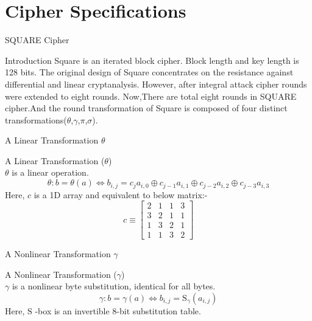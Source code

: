 \section{Cipher Specifications}

\begin{frame}{SQUARE Cipher}
  \begin{beamerboxesrounded}{Introduction}
      Square is an iterated block cipher. Block length and key length is 128 bits.
      The original design of Square concentrates on the resistance against differential and linear cryptanalysis. However, after integral attack cipher rounds were extended to eight rounds. Now,There are total eight rounds in SQUARE cipher.And the round transformation of Square is composed of four distinct transformations($\theta$,$\gamma$,$\pi$,$\sigma$).
  \end{beamerboxesrounded}
\end{frame}


\begin{frame}{A Linear Transformation $\theta$}
    \begin{beamerboxesrounded}{A Linear Transformation ($\theta$)} \\
        $\theta$ is a linear operation.
        $$
        \theta: b=\theta(a) \Leftrightarrow b_{i, j}=c_{j} a_{i, 0} \oplus c_{j-1} a_{i, 1} \oplus c_{j-2} a_{i, 2} \oplus c_{j-3} a_{i, 3}
        $$
        Here, $c$ is a 1D array and equivalent to below matrix:-  \\
        \begin{equation*}
          c   \equiv \begin{bmatrix}
            2 & 1 & 1 & 3 \\
            3 & 2 & 1 & 1 \\
            1 & 3 & 2 & 1 \\
            1 & 1 & 3 & 2
          \end{bmatrix}
        \end{equation*}
    \end{beamerboxesrounded}
\end{frame}

\begin{frame}{A Nonlinear Transformation $\gamma$}
    \begin{beamerboxesrounded}{A Nonlinear Transformation ($\gamma$)}\\
        $\gamma$ is a nonlinear byte substitution, identical for all bytes.
        $$
        \gamma: b=\gamma(a) \Leftrightarrow b_{i, j}=\mathrm{S}_{\gamma}\left(a_{i, j}\right)
        $$
        Here, $\mathrm{S}$ -box is an invertible 8-bit substitution table. 
    \end{beamerboxesrounded}
\end{frame}

